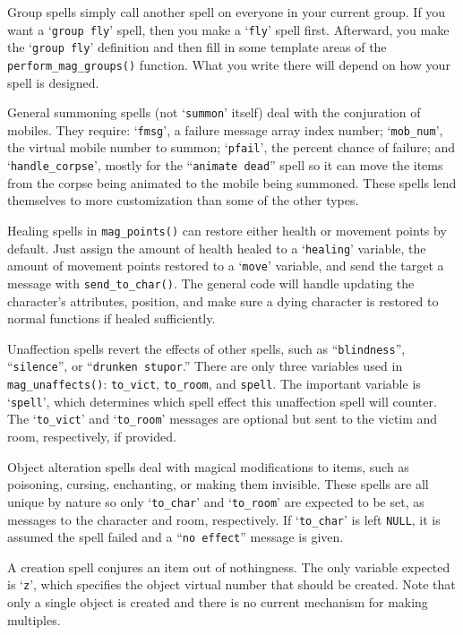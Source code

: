 \documentclass[11pt]{article}
\begin{document}
\par
Group spells simply call another spell on everyone in your current group.  If you want a `\texttt{group fly}' spell, then you make a `\texttt{fly}' spell first.  Afterward, you make the `\texttt{group fly}' definition and then fill in some template areas of the \texttt{perform\_mag\_groups()} function.  What you write there will depend on how your spell is designed.
\par
General summoning spells (not `\texttt{summon}' itself) deal with the conjuration of mobiles.  They require: `\texttt{fmsg}', a failure message array index number; `\texttt{mob\_num}', the virtual mobile number to summon; `\texttt{pfail}', the percent chance of failure; and `\texttt{handle\_corpse}', mostly for the ``\texttt{animate dead}'' spell so it can move the items from the corpse being animated to the mobile being summoned.  These spells lend themselves to more customization than some of the other types.
\par
Healing spells in \texttt{mag\_points()} can restore either health or movement points by default. Just assign the amount of health healed to a `\texttt{healing}' variable, the amount of movement points restored to a `\texttt{move}' variable, and send the target a message with \texttt{send\_to\_char()}.  The general code will handle updating the character's attributes, position, and make sure a dying character is restored to normal functions if healed sufficiently.
\par
Unaffection spells revert the effects of other spells, such as ``\texttt{blindness}'', ``\texttt{silence}'', or ``\texttt{drunken stupor}.'' There are only three variables used in \texttt{mag\_unaffects()}: \texttt{to\_vict}, \texttt{to\_room}, and \texttt{spell}.  The important variable is `\texttt{spell}', which determines which spell effect this unaffection spell will counter.  The `\texttt{to\_vict}' and `\texttt{to\_room}' messages are optional but sent to the victim and room, respectively, if provided.
\par
Object alteration spells deal with magical modifications to items, such as poisoning, cursing, enchanting, or making them invisible.  These spells are all unique by nature so only `\texttt{to\_char}' and `\texttt{to\_room}' are expected to be set, as messages to the character and room, respectively. If `\texttt{to\_char}' is left \texttt{NULL}, it is assumed the spell failed and a ``\texttt{no effect}'' message is given.
\par
A creation spell conjures an item out of nothingness.  The only variable expected is `\texttt{z}', which specifies the object virtual number that should be created.  Note that only a single object is created and there is no current mechanism for making multiples.
\end{document}
